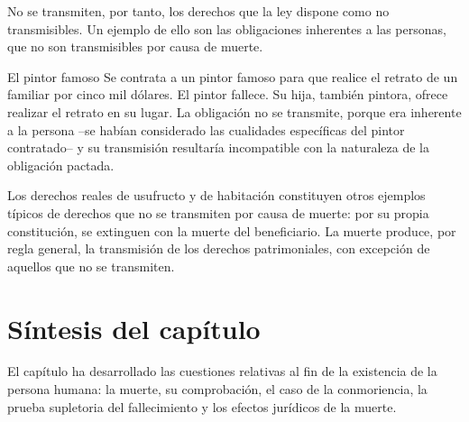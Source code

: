 \documentclass[12pt,oneside]{book}
\begin{document}
No se transmiten, por tanto, los derechos que la ley dispone como no transmisibles. Un ejemplo de ello son las obligaciones inherentes a las personas, que no son transmisibles por causa de muerte.

\begin{example}{El pintor famoso}
Se contrata a un pintor famoso para que realice el retrato de un familiar por cinco mil dólares. El pintor fallece. Su hija, también pintora, ofrece realizar el retrato en su lugar. La obligación no se transmite, porque era inherente a la persona --se habían considerado las cualidades específicas del pintor contratado-- y su transmisión resultaría incompatible con la naturaleza de la obligación pactada.
\end{example}

Los derechos reales de usufructo y de habitación constituyen otros ejemplos típicos de derechos que no se transmiten por causa de muerte: por su propia constitución, se extinguen con la muerte del beneficiario. La muerte produce, por regla general, la transmisión de los derechos patrimoniales, con excepción de aquellos que no se transmiten.

\section{Síntesis del capítulo}
El capítulo ha desarrollado las cuestiones relativas al fin de la existencia de la persona humana: la muerte, su comprobación, el caso de la conmoriencia, la prueba supletoria del fallecimiento y los efectos jurídicos de la muerte.

\end{document}
